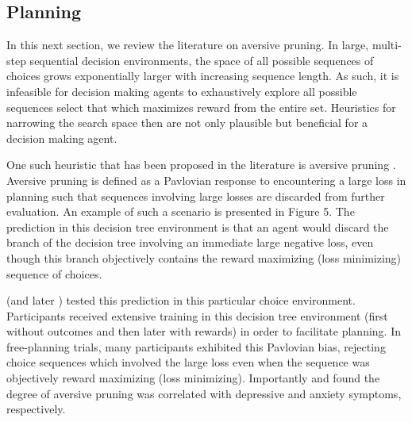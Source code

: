 \documentclass[11pt]{article} %
\begin{document}
\subsection{Planning}

In this next section, we review the literature on aversive pruning. In large, multi-step sequential decision environments, the space of all possible sequences of choices grows exponentially larger with increasing sequence length. As such, it is infeasible for decision making agents to exhaustively explore all possible sequences select that which maximizes reward from the entire set. Heuristics for narrowing the search space then are not only plausible but beneficial for a decision making agent.

One such heuristic that has been proposed in the literature is aversive pruning \citep{Huys2012}. Aversive pruning is defined as a Pavlovian response to encountering a large loss in planning such that sequences involving large losses are discarded from further evaluation. An example of such a scenario is presented in Figure 5. The prediction in this decision tree environment is that an agent would discard the branch of the decision tree involving an immediate large negative loss, even though this branch objectively contains the reward maximizing (loss minimizing) sequence of choices.

\cite{Huys2012} (and later \cite{Lally2017}) tested this prediction in this particular choice environment. Participants received extensive training in this decision tree environment (first without outcomes and then later with rewards) in order to facilitate planning. In free-planning trials, many participants exhibited this Pavlovian bias, rejecting choice sequences which involved the large loss even when the sequence was objectively reward maximizing (loss minimizing). Importantly \cite{Huys2012} and \cite{Lally2017} found the degree of aversive pruning was correlated with depressive and anxiety symptoms, respectively.
\end{document}
